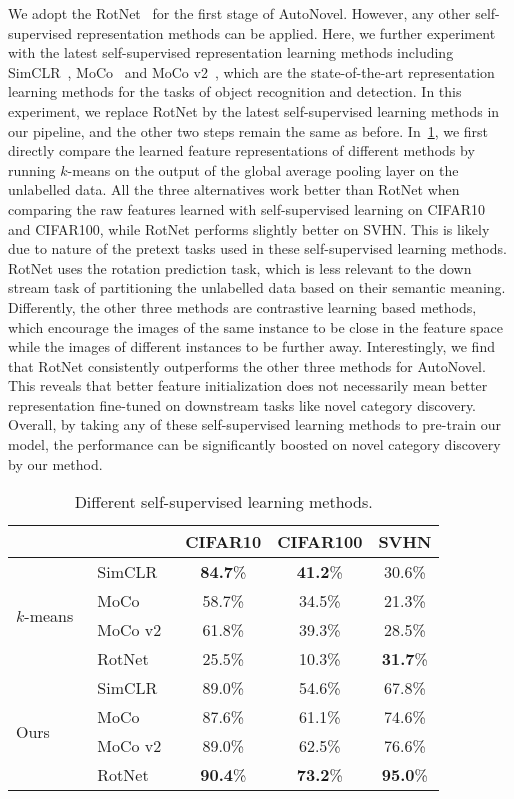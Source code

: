 We adopt the RotNet~\cite{gidaris2018unsupervised} for the first stage of AutoNovel. However, any other self-supervised representation methods can be applied. Here, we further experiment with the latest self-supervised representation learning methods including SimCLR~\cite{chen2020simple}, MoCo~\cite{he2020moco} and MoCo v2~\cite{chen2020mocov2}, which are the state-of-the-art representation learning methods for the tasks of object recognition and detection.
In this experiment, we replace RotNet by the latest self-supervised learning methods in our pipeline, and the other two steps remain the same as before.
In~\cref{tab:diff_selfsup}, we first directly compare the learned feature representations of different methods by running $k$-means on the output of the global average pooling layer on the unlabelled data.
All the three alternatives work better than RotNet when comparing the raw features learned with self-supervised learning on CIFAR10 and CIFAR100, while RotNet performs slightly better on SVHN\@.
This is likely due to nature of the pretext tasks used in these self-supervised learning methods.
RotNet uses the rotation prediction task, which is less relevant to the down stream task of partitioning the unlabelled data based on their semantic meaning.
Differently, the other three methods are contrastive learning based methods, which encourage the images of the same instance to be close in the feature space while the images of different instances to be further away.
Interestingly, we find that RotNet consistently outperforms the other three methods for AutoNovel.
This reveals that better feature initialization does not necessarily mean better representation fine-tuned on downstream tasks like novel category discovery.
Overall, by taking any of these self-supervised learning methods to pre-train our model, the performance can be significantly boosted on novel category discovery by our method.

\begin{table}[htb]
\centering
\footnotesize
\caption{Different self-supervised learning methods.}\label{tab:diff_selfsup}
\begin{tabular}{llccc}
\toprule
& & CIFAR10 & CIFAR100 & SVHN  \\
\midrule
\multirow{4}{*}{$k$-means~\cite{MackQueen67_Kmeans}}
 &SimCLR~\cite{chen2020simple} & \textbf{84.7}\% & \textbf{41.2}\% & 30.6\% \\
 &MoCo~\cite{he2020moco} & 58.7\% & 34.5\% & 21.3\% \\
 &MoCo v2~\cite{chen2020mocov2} & 61.8\% & 39.3\% & 28.5\% \\
 &RotNet~\cite{gidaris2018unsupervised} & 25.5\% &10.3\% & \textbf{31.7}\% \\
\midrule
\multirow{4}{*}{Ours}
 &SimCLR~\cite{chen2020simple} & 89.0\% & 54.6\% & 67.8\% \\
 &MoCo~\cite{he2020moco} & 87.6\% & 61.1\% & 74.6\% \\
 &MoCo v2~\cite{chen2020mocov2} & 89.0\% & 62.5\% & 76.6\% \\
 &RotNet~\cite{gidaris2018unsupervised} & \textbf{90.4}\% & \textbf{73.2}\% & \textbf{95.0}\% \\
\bottomrule
\end{tabular}
\end{table}

